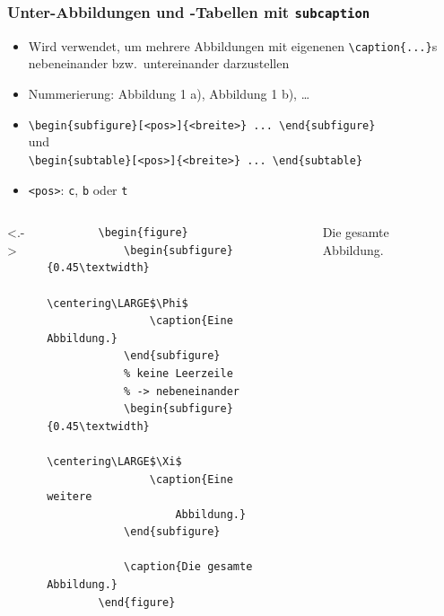 \begin{frame}[<+->][fragile]
	\frametitle{Unter-Abbildungen und -Tabellen mit \texttt{subcaption}}
	\begin{itemize}
		\item Wird verwendet, um mehrere Abbildungen mit eigenenen \lstinline!\caption{...}!s nebeneinander bzw.\ untereinander darzustellen
		\item Nummerierung: Abbildung 1 a), Abbildung 1 b), …
		\item \lstinline!\begin{subfigure}[<pos>]{<breite>} ... \end{subfigure}!\\
		und\\
		\lstinline!\begin{subtable}[<pos>]{<breite>} ... \end{subtable}!
		\item \lstinline!<pos>!: \lstinline!c!, \lstinline!b! oder \lstinline!t!
	\end{itemize}
\end{frame}


\begin{frame}[<+->][fragile]
	\begin{columns}<.->
		\lstset{basicstyle=\footnotesize\ttfamily, frame=L, numbers=left, xleftmargin=0.5cm}
		\begin{lstlisting}
		\begin{figure}
		    \begin{subfigure}{0.45\textwidth}
		        \centering\LARGE$\Phi$
		        \caption{Eine Abbildung.}
		    \end{subfigure}
		    % keine Leerzeile
		    % -> nebeneinander
		    \begin{subfigure}{0.45\textwidth}
		        \centering\LARGE$\Xi$
		        \caption{Eine weitere
		            Abbildung.}
		    \end{subfigure}
		    
		    \caption{Die gesamte Abbildung.}
		\end{figure}
		\end{lstlisting}
		\begin{figure}

			\caption{Die gesamte Abbildung.}
		\end{figure}
	\end{columns}
	
	\bigskip
\end{frame}

